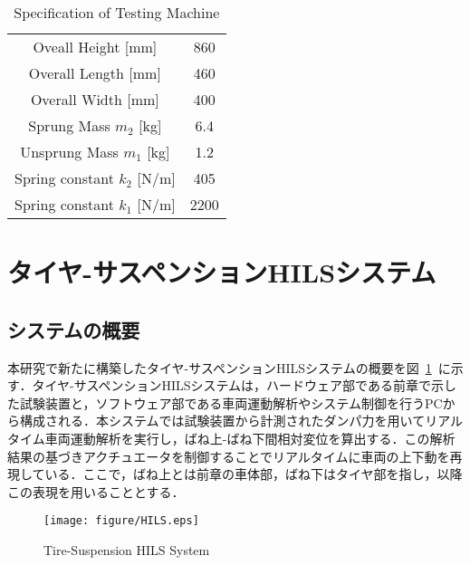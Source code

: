 \documentclass[a4paper,12pt]{article_vdlab_sotsuron}
\begin{document}
\vspace*{10mm}
\begin{table}[htp]
    \begin{center}
      \makeatletter
      \def\@captype{table}   
      \makeatother
      \caption{Specification of Testing Machine}
	\label{tab:testing_machine}
	  \begin{tabular}{cc}\hline
	    Oveall Height [mm] & 860\\
	    Overall Length [mm] & 460\\ 
	    Overall Width [mm] & 400\\
	    Sprung Mass $m_2$ [kg] & 6.4 \\
	    Unsprung Mass $m_1$ [kg] & 1.2\\ 
	    Spring constant $k_2$ [N/m] & 405\\
	    Spring constant $k_1$ [N/m] & 2200\\\hline
	\end{tabular}  
      \end{center}
\end{table}

\newpage
\section{タイヤ-サスペンションHILSシステム}
\subsection{システムの概要}
本研究で新たに構築したタイヤ-サスペンションHILSシステムの概要を図~\ref{fig:HILS}~に示す．タイヤ-サスペンションHILSシステムは，ハードウェア部である前章で示した試験装置と，ソフトウェア部である車両運動解析やシステム制御を行うPCから構成される．本システムでは試験装置から計測されたダンパ力を用いてリアルタイム車両運動解析を実行し，ばね上-ばね下間相対変位を算出する．この解析結果の基づきアクチュエータを制御することでリアルタイムに車両の上下動を再現している．ここで，ばね上とは前章の車体部，ばね下はタイヤ部を指し，以降この表現を用いることとする．

\vspace*{10mm}
\begin{figure}[htp]
  \begin{center}
    \texttt{[image: figure/HILS.eps]}
    \vspace*{3mm}
    \caption{Tire-Suspension HILS System}
    \label{fig:HILS}
  \end{center}
\end{figure}
\end{document}
